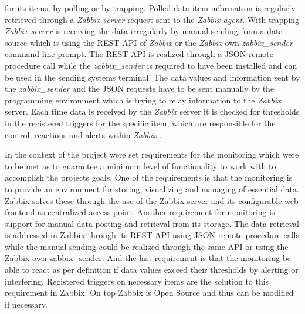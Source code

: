 for its items, by polling or by trapping. Polled data item information is regularly retrieved through a \textit{Zabbix server} request sent to the \textit{Zabbix agent}. With trapping \textit{Zabbix server} is receiving the data irregularly by manual sending from a data source which is using the REST API of \textit{Zabbix} or the \textit{Zabbix} own \textit{zabbix\_sender} command line prompt. The REST API is realized through a JSON remote procedure call while the \textit{zabbix\_sender} is required to have been installed and can be used in the sending systems terminal. The data values and information sent by the \textit{zabbix\_sender} and the JSON requests have to be sent manually by the programming environment which is trying to relay information to the \textit{Zabbix} server. Each time data is received by the \textit{Zabbix} server it is checked for thresholds in the registered triggers for the specific item, which are responsible for the control, reactions and alerts within \textit{Zabbix} \cite{zab2, zab3}.
	
	In the context of the project were set requirements for the monitoring which were to be met as to guarantee a minimum level of functionality to work with to accomplish the projects goals. One of the requirements is that the monitoring is to provide an environment for storing, visualizing and managing of essential data. Zabbix solves these through the use of the Zabbix server and its configurable web frontend as centralized access point. Another requirement for monitoring is support for manual data posting and retrieval from its storage. The data retrieval is addressed in Zabbix through its REST API using JSON remote procedure calls while the manual sending could be realized through the same API or using the Zabbix own zabbix\_sender. And the last requirement is that the monitoring be able to react as per definition if data values exceed their thresholds by alerting or interfering. Registered triggers on necessary items are the solution to this requirement in Zabbix. On top Zabbix is Open Source and thus can be modified if necessary.
